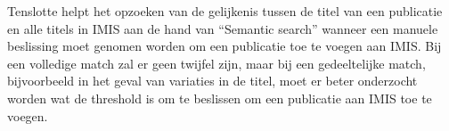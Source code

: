 Tenslotte helpt het opzoeken van de gelijkenis tussen de titel van een publicatie en alle titels in IMIS aan de hand van ``Semantic search'' wanneer een manuele beslissing moet genomen worden om een publicatie toe te voegen aan IMIS. Bij een volledige match zal er geen twijfel zijn, maar bij een gedeeltelijke match, bijvoorbeeld in het geval van variaties in de titel, moet er beter onderzocht worden wat de threshold is om te beslissen om een publicatie aan IMIS toe te voegen.

